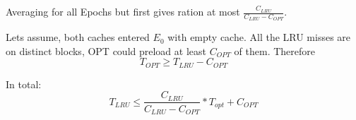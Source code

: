 \documentclass[12pt]{article}
\begin{document}
Averaging for all Epochs but first gives ration at most $\frac{C_{LRU}}{C_{LRU} - C_{OPT}}$.

Lets assume, both caches entered $E_0$ with empty cache. All the LRU misses are on distinct blocks, OPT could preload at least $C_{OPT}$ of them. Therefore
\[ T_{OPT} \geq T_{LRU} - C_{OPT} \]

In total:
\[T_{LRU} \leq \frac{C_{LRU}}{C_{LRU} - C_{OPT}} * T_{opt} + C_{OPT}\]

\end{document}
